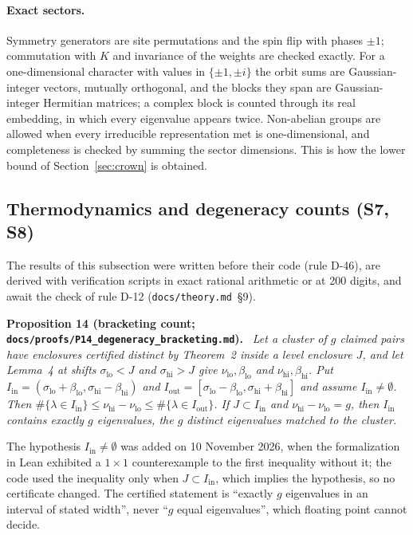 \documentclass[11pt,a4paper]{article}
\newcommand{\code}[1]{\texttt{#1}}
\newenvironment{result}[1]{\par\medskip\noindent\textbf{#1.}\ \itshape}{\par\medskip}
\begin{document}
\paragraph{Exact sectors.}
Symmetry generators are site permutations and the spin flip with phases $\pm1$; commutation with $K$ and invariance
of the weights are checked exactly. For a one-dimensional character with values in $\{\pm1,\pm i\}$ the orbit sums
are Gaussian-integer vectors, mutually orthogonal, and the blocks they span are Gaussian-integer Hermitian matrices; a
complex block is counted through its real embedding, in which every eigenvalue appears twice. Non-abelian groups are
allowed when every irreducible representation met is one-dimensional, and completeness is checked by summing the
sector dimensions. This is how the lower bound of Section~\ref{sec:crown} is obtained.

\subsection{Thermodynamics and degeneracy counts (S7, S8)}

The results of this subsection were written before their code (rule D-46), are derived with verification scripts in
exact rational arithmetic or at 200 digits, and await the check of rule D-12 (\code{docs/theory.md}~\S9).

\begin{result}{Proposition 14 (bracketing count; \code{docs/proofs/P14\_degeneracy\_bracketing.md})}
Let a cluster of $g$ claimed pairs have enclosures certified distinct by Theorem~2 inside a level enclosure $J$, and
let Lemma~4 at shifts $\sigma_{\mathrm{lo}}<J$ and $\sigma_{\mathrm{hi}}>J$ give $\nu_{\mathrm{lo}},\beta_{\mathrm{lo}}$
and $\nu_{\mathrm{hi}},\beta_{\mathrm{hi}}$. Put $I_{\mathrm{in}}=(\sigma_{\mathrm{lo}}+\beta_{\mathrm{lo}},
\sigma_{\mathrm{hi}}-\beta_{\mathrm{hi}})$ and $I_{\mathrm{out}}=[\sigma_{\mathrm{lo}}-\beta_{\mathrm{lo}},
\sigma_{\mathrm{hi}}+\beta_{\mathrm{hi}}]$ and assume $I_{\mathrm{in}}\neq\emptyset$. Then
$\#\{\lambda\in I_{\mathrm{in}}\}\le\nu_{\mathrm{hi}}-\nu_{\mathrm{lo}}\le\#\{\lambda\in I_{\mathrm{out}}\}$. If
$J\subset I_{\mathrm{in}}$ and $\nu_{\mathrm{hi}}-\nu_{\mathrm{lo}}=g$, then $I_{\mathrm{in}}$ contains exactly $g$
eigenvalues, the $g$ distinct eigenvalues matched to the cluster.
\end{result}

The hypothesis $I_{\mathrm{in}}\neq\emptyset$ was added on 10 November 2026, when the formalization in Lean exhibited a
$1\times1$ counterexample to the first inequality without it; the code used the inequality only when $J\subset
I_{\mathrm{in}}$, which implies the hypothesis, so no certificate changed. The certified statement is ``exactly $g$
eigenvalues in an interval of stated width'', never ``$g$ equal eigenvalues'', which floating point cannot decide.
\end{document}
